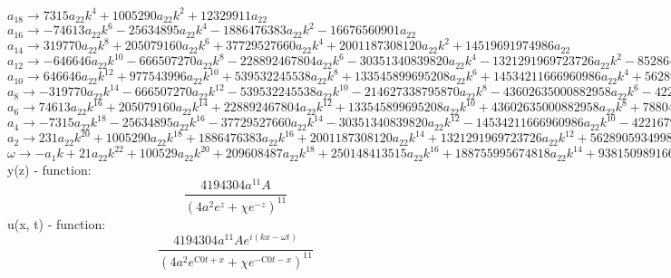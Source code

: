 \documentclass[12pt,a4paper,draft]{article}
\begin{document}
$a_{18}\to 7315 a_{22} k^4+1005290 a_{22} k^2+12329911 a_{22}$\\
$a_{16}\to -74613 a_{22} k^6-25634895 a_{22} k^4-1886476383 a_{22} k^2-16676560901 a_{22}$\\
$a_{14}\to 319770 a_{22} k^8+205079160 a_{22} k^6+37729527660 a_{22} k^4+2001187308120 a_{22} k^2+14519691974986 a_{22}$\\
$a_{12}\to -646646 a_{22} k^{10}-666507270 a_{22} k^8-228892467804 a_{22} k^6-30351340839820 a_{22} k^4-1321291969723726 a_{22} k^2-8528645356058126 a_{22}$\\
$a_{10}\to 646646 a_{22} k^{12}+977543996 a_{22} k^{10}+539532245538 a_{22} k^8+133545899695208 a_{22} k^6+14534211666960986 a_{22} k^4+562890593499836316 a_{22} k^2+3441772651808322766 a_{22}$\\
$a_{8}\to -319770 a_{22} k^{14}-666507270 a_{22} k^{12}-539532245538 a_{22} k^{10}-214627338795870 a_{22} k^8-43602635000882958 a_{22} k^6-4221679451248772370 a_{22} k^4-154879769331374524470 a_{22} k^2-952258695948480426506 a_{22}$\\
$a_{6}\to 74613 a_{22} k^{16}+205079160 a_{22} k^{14}+228892467804 a_{22} k^{12}+133545899695208 a_{22} k^{10}+43602635000882958 a_{22} k^8+7880468308997708424 a_{22} k^6+722772256879747780860 a_{22} k^4+26663243486557451942168 a_{22} k^2+176635043848108568605861 a_{22}$\\
$a_{4}\to -7315 a_{22} k^{18}-25634895 a_{22} k^{16}-37729527660 a_{22} k^{14}-30351340839820 a_{22} k^{12}-14534211666960986 a_{22} k^{10}-4221679451248772370 a_{22} k^8-722772256879747780860 a_{22} k^6-66658108716393629855420 a_{22} k^4-2649525657721628529087915 a_{22} k^2-20872739425587616666078551 a_{22}$\\
$a_{2}\to 231 a_{22} k^{20}+1005290 a_{22} k^{18}+1886476383 a_{22} k^{16}+2001187308120 a_{22} k^{14}+1321291969723726 a_{22} k^{12}+562890593499836316 a_{22} k^{10}+154879769331374524470 a_{22} k^8+26663243486557451942168 a_{22} k^6+2649525657721628529087915 a_{22} k^4+125236436553525699996471306 a_{22} k^2+1410931579974248996727086475 a_{22}$\\
$\omega \to -a_{1} k+21 a_{22} k^{22}+100529 a_{22} k^{20}+209608487 a_{22} k^{18}+250148413515 a_{22} k^{16}+188755995674818 a_{22} k^{14}+93815098916639386 a_{22} k^{12}+30975953866274904894 a_{22} k^{10}+6665810871639362985542 a_{22} k^8+883175219240542843029305 a_{22} k^6+62618218276762849998235653 a_{22} k^4+1410931579974248996727086475 a_{22} k^2-41236408035934408387856390625 a_{22}$\\


y(z) - function:
$$
\frac{4194304 a^{11} A}{\left(4 a^2 e^z+\chi  e^{-z}\right)^{11}}
$$
u(x, t) - function:
$$
\frac{4194304 a^{11} A e^{i (k x-\omega  t)}}{\left(4 a^2 e^{\text{C0} t+x}+\chi  e^{-\text{C0} t-x}\right)^{11}}
$$
\end{document}
